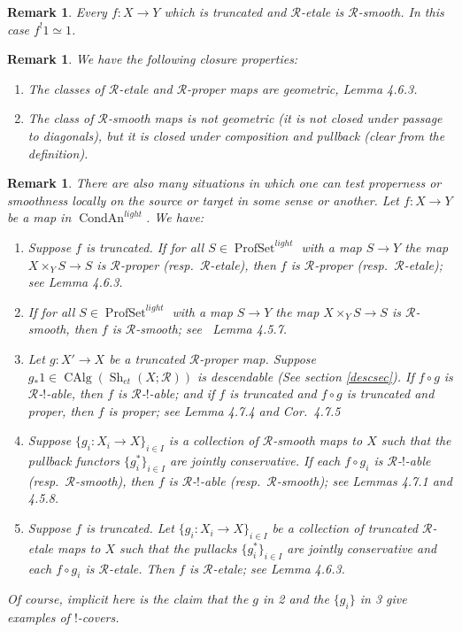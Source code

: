 \documentclass[12pt]{article}
\newtheorem{remark}[theorem]{Remark}
\newcommand{\on}{\operatorname}
\begin{document}
\begin{remark}
Every $f:X\to Y$ which is truncated and $\mathcal{R}$-etale is $\mathcal{R}$-smooth.  In this case $f^!1\simeq 1$.
\end{remark}
\begin{remark}
We have the following closure properties:
\begin{enumerate}
\item The classes of $\mathcal{R}$-etale and $\mathcal{R}$-proper maps are geometric, \cite{HeyerSixFunctors} Lemma 4.6.3.
\item The class of $\mathcal{R}$-smooth maps is not geometric (it is not closed under passage to diagonals), but it is closed under composition and pullback (clear from the definition).
\end{enumerate}

\end{remark}

\begin{remark}\label{etalepropersmoothlocal}
There are also many situations in which one can test properness or smoothness locally on the source or target in some sense or another.  Let $f:X\to Y$ be a map in $\on{CondAn}^{light}$.  We have:
\begin{enumerate}
\item Suppose $f$ is truncated.  If for all $S\in\on{ProfSet}^{light}$ with a map $S\to Y$ the map $X\times_Y S \to S$ is $\mathcal{R}$-proper (resp.\ $\mathcal{R}$-etale), then $f$ is $\mathcal{R}$-proper (resp.\ $\mathcal{R}$-etale); see \cite{HeyerSixFunctors} Lemma 4.6.3.
\item If for all $S\in\on{ProfSet}^{light}$ with a map $S\to Y$ the map $X\times_Y S \to S$ is $\mathcal{R}$-smooth, then $f$ is $\mathcal{R}$-smooth; see \cite{HeyerSixFunctors} Lemma 4.5.7.
\item Let $g:X'\to X$ be a truncated $\mathcal{R}$-proper map.  Suppose $g_\ast 1\in \on{CAlg}(\on{Sh}_{et}(X;\mathcal{R}))$ is descendable (See section \ref{descsec}).  If $f\circ g$ is $\mathcal{R}$-$!$-able, then $f$ is $\mathcal{R}$-$!$-able; and if $f$ is truncated and $f\circ g$ is truncated and proper, then $f$ is proper; see \cite{HeyerSixFunctors} Lemma 4.7.4 and  Cor.\ 4.7.5
\item Suppose $\{g_i:X_i\to X\}_{i\in I}$ is a collection of $\mathcal{R}$-smooth maps to $X$ such that the pullback functors $\{g_i^\ast\}_{i\in I}$ are jointly conservative.  If each $f\circ g_i$ is $\mathcal{R}$-$!$-able (resp.\ $\mathcal{R}$-smooth), then $f$ is $\mathcal{R}$-$!$-able (resp.\ $\mathcal{R}$-smooth); see \cite{HeyerSixFunctors} Lemmas 4.7.1 and 4.5.8.
\item Suppose $f$ is truncated.  Let $\{g_i:X_i\to X\}_{i\in I}$ be a collection of truncated $\mathcal{R}$-etale maps to $X$ such that the pullacks $\{g_i^\ast\}_{i\in I}$ are jointly conservative and each $f\circ g_i$ is $\mathcal{R}$-etale.  Then $f$ is $\mathcal{R}$-etale; see \cite{HeyerSixFunctors} Lemma 4.6.3.
\end{enumerate}
Of course, implicit here is the claim that the $g$ in 2 and the $\{g_i\}$ in 3 give examples of $!$-covers.
\end{remark}
\end{document}
